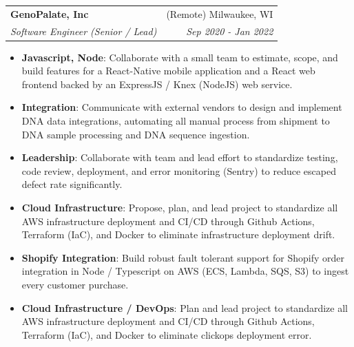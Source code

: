 \documentclass[letterpaper,11pt]{article}
\makeatletter
\newcommand{\resumeItem}[2]{
  \item\small{
    \textbf{#1}{: #2 \vspace{-2pt}}
  }
}
\newcommand{\resumeSubheading}[4]{
  \vspace{-1pt}\item
    \begin{tabular*}{0.97\textwidth}{l@{\extracolsep{\fill}}r}
      \textbf{#1} & #2 \\
      \textit{\small#3} & \textit{\small #4} \\
    \end{tabular*}\vspace{-5pt}
}
\newcommand{\resumeItemListStart}{\begin{itemize}}
\newcommand{\resumeItemListEnd}{\end{itemize}\vspace{-5pt}}
\makeatother
\begin{document}
    \resumeSubheading
      {GenoPalate, Inc}{(Remote) Milwaukee, WI}
      {Software Engineer (Senior / Lead)}{Sep 2020 - Jan 2022}
      \resumeItemListStart
        \resumeItem{Javascript, Node}
          {Collaborate with a small team to estimate, scope, and build features for a React-Native mobile application and a React web frontend backed by an ExpressJS / Knex (NodeJS) web service.}
        \resumeItem{Integration}
          {Communicate with external vendors to design and implement DNA data integrations, automating all manual process from shipment to DNA sample processing and DNA sequence ingestion.}
        \resumeItem{Leadership}
          {Collaborate with team and lead effort to standardize testing, code review, deployment, and error monitoring (Sentry) to reduce escaped defect rate significantly.}
        \resumeItem{Cloud Infrastructure}
          {Propose, plan, and lead project to standardize all AWS infrastructure deployment and CI/CD through Github Actions, Terraform (IaC), and Docker to eliminate infrastructure deployment drift.}
        \resumeItem{Shopify Integration}
          {Build robust fault tolerant support for Shopify order integration in Node / Typescript on AWS (ECS, Lambda, SQS, S3) to ingest every customer purchase.}
        \resumeItem{Cloud Infrastructure / DevOps}
          {Plan and lead project to standardize all AWS infrastructure deployment and CI/CD through Github Actions, Terraform (IaC), and Docker to eliminate clickops deployment error.}
      \resumeItemListEnd
\end{document}
